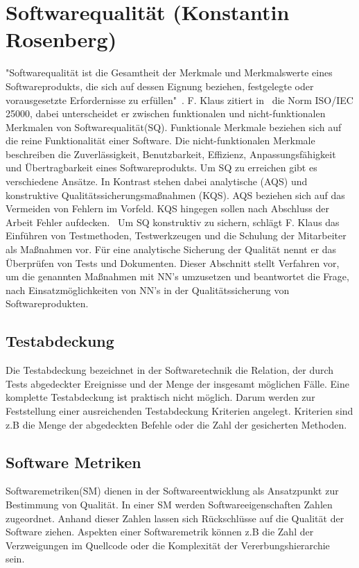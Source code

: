 \section{Softwarequalität (Konstantin Rosenberg)} \label{SQ}
"Softwarequalität ist die Gesamtheit der Merkmale und Merkmalswerte eines Softwareprodukts, die sich auf dessen Eignung beziehen,
festgelegte oder vorausgesetzte
Erfordernisse zu erfüllen"~\cite[p.~20]{Franz2015}.
F. Klaus zitiert in~\cite[p.~20]{Franz2015} die Norm ISO/IEC 25000, dabei unterscheidet er zwischen funktionalen und nicht-funktionalen Merkmalen von Softwarequalität(SQ).
Funktionale Merkmale beziehen sich auf die reine Funktionalität einer Software. Die nicht-funktionalen Merkmale beschreiben die Zuverlässigkeit, Benutzbarkeit, Effizienz, Anpassungsfähigkeit und Übertragbarkeit eines Softwareprodukts.
Um SQ zu erreichen gibt es verschiedene Ansätze. In Kontrast stehen dabei analytische (AQS) und konstruktive Qualitätssicherungsmaßnahmen (KQS). AQS beziehen sich auf das Vermeiden von Fehlern im Vorfeld. KQS hingegen sollen nach Abschluss der Arbeit Fehler aufdecken.~\cite[p.~29]{Franz2015} 
Um SQ konstruktiv zu sichern, schlägt F. Klaus das Einführen von Testmethoden, Testwerkzeugen und die Schulung der Mitarbeiter als Maßnahmen vor. Für eine analytische Sicherung der Qualität nennt er das Überprüfen von Tests und Dokumenten.
Dieser Abschnitt stellt Verfahren vor, um die genannten Maßnahmen mit NN's umzusetzen und beantwortet die Frage, nach Einsatzmöglichkeiten von NN's in der Qualitätssicherung von Softwareprodukten.

\subsection{Testabdeckung}
Die Testabdeckung bezeichnet in der Softwaretechnik die Relation, der durch Tests abgedeckter Ereignisse und der Menge der insgesamt möglichen Fälle. Eine komplette Testabdeckung ist praktisch nicht möglich. Darum werden zur Feststellung einer ausreichenden Testabdeckung Kriterien angelegt.
Kriterien sind z.B die Menge der abgedeckten Befehle oder die Zahl der gesicherten Methoden.~\cite{Antinyan2018}

\subsection{Software Metriken}
Softwaremetriken(SM) dienen in der Softwareentwicklung als Ansatzpunkt zur Bestimmung von Qualität. In einer SM werden Softwareeigenschaften Zahlen zugeordnet. Anhand dieser Zahlen lassen sich Rückschlüsse auf die Qualität der Software ziehen. Aspekten einer Softwaremetrik können z.B die Zahl der Verzweigungen im Quellcode oder die Komplexität der Vererbungshierarchie sein.~\cite[p.~3]{Committee1998}

